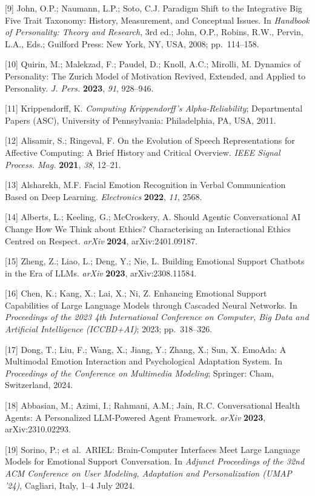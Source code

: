 \documentclass[apajournal,article,submit,moreauthors]{Definitions/mdpi}
\begin{document}
{[}9{]} John, O.P.; Naumann, L.P.; Soto, C.J. Paradigm Shift to the Integrative Big Five Trait Taxonomy: History, Measurement, and Conceptual Issues. In \emph{Handbook of Personality: Theory and Research}, 3rd ed.; John, O.P., Robins, R.W., Pervin, L.A., Eds.; Guilford Press: New York, NY, USA, 2008; pp.~114--158.

{[}10{]} Quirin, M.; Malekzad, F.; Paudel, D.; Knoll, A.C.; Mirolli, M. Dynamics of Personality: The Zurich Model of Motivation Revived, Extended, and Applied to Personality. \emph{J. Pers.} \textbf{2023}, \emph{91}, 928--946.

{[}11{]} Krippendorff, K. \emph{Computing Krippendorff's Alpha-Reliability}; Departmental Papers (ASC), University of Pennsylvania: Philadelphia, PA, USA, 2011.

{[}12{]} Alisamir, S.; Ringeval, F. On the Evolution of Speech Representations for Affective Computing: A Brief History and Critical Overview. \emph{IEEE Signal Process. Mag.} \textbf{2021}, \emph{38}, 12--21.

{[}13{]} Alsharekh, M.F. Facial Emotion Recognition in Verbal Communication Based on Deep Learning. \emph{Electronics} \textbf{2022}, \emph{11}, 2568.

{[}14{]} Alberts, L.; Keeling, G.; McCroskery, A. Should Agentic Conversational AI Change How We Think about Ethics? Characterising an Interactional Ethics Centred on Respect. \emph{arXiv} \textbf{2024}, arXiv:2401.09187.

{[}15{]} Zheng, Z.; Liao, L.; Deng, Y.; Nie, L. Building Emotional Support Chatbots in the Era of LLMs. \emph{arXiv} \textbf{2023}, arXiv:2308.11584.

{[}16{]} Chen, K.; Kang, X.; Lai, X.; Ni, Z. Enhancing Emotional Support Capabilities of Large Language Models through Cascaded Neural Networks. In \emph{Proceedings of the 2023 4th International Conference on Computer, Big Data and Artificial Intelligence (ICCBD+AI)}; 2023; pp.~318--326.

{[}17{]} Dong, T.; Liu, F.; Wang, X.; Jiang, Y.; Zhang, X.; Sun, X. EmoAda: A Multimodal Emotion Interaction and Psychological Adaptation System. In \emph{Proceedings of the Conference on Multimedia Modeling}; Springer: Cham, Switzerland, 2024.

{[}18{]} Abbasian, M.; Azimi, I.; Rahmani, A.M.; Jain, R.C. Conversational Health Agents: A Personalized LLM-Powered Agent Framework. \emph{arXiv} \textbf{2023}, arXiv:2310.02293.

{[}19{]} Sorino, P.; et al.~ARIEL: Brain-Computer Interfaces Meet Large Language Models for Emotional Support Conversation. In \emph{Adjunct Proceedings of the 32nd ACM Conference on User Modeling, Adaptation and Personalization (UMAP '24)}, Cagliari, Italy, 1--4 July 2024.
\end{document}
